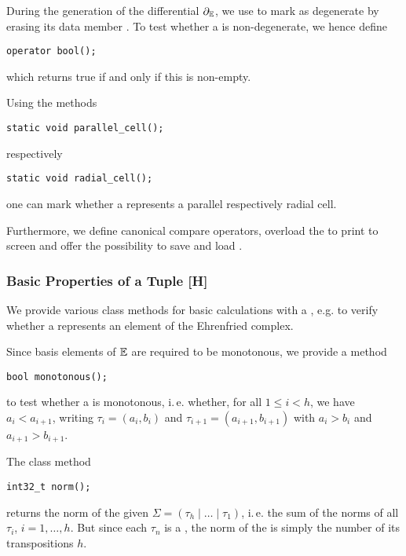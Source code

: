 During the generation of the differential $\partial_\mathbb E$, we use to mark  as degenerate by
erasing its data member .
To test whether a  is non-degenerate, we hence define  
\begin{lstlisting}
operator bool();
\end{lstlisting}
which returns true if and only if this  is non-empty.

Using the methods
\begin{lstlisting}
static void parallel_cell(); 
\end{lstlisting}
respectively
\begin{lstlisting}
static void radial_cell();
\end{lstlisting}
one can mark whether a  represents a parallel respectively radial cell.

Furthermore, we define canonical compare operators, 
overload the  to print  to screen
and offer the possibility to save and load .

\subsubsection{Basic Properties of a Tuple [H]}\label{program:kappa:tuple:basics}

We provide various class methods for basic calculations with a ,
e.g. to verify whether a  represents an element of the Ehrenfried complex. 

Since basis elements of $\mathbb E$ are required to be monotonous, we provide a method
\begin{lstlisting}
bool monotonous();
\end{lstlisting}
to test whether a  is monotonous, i.\,e. whether, for all $1 \leq i < h$, we have $a_i < a_{i+1}$, 
writing $\tau_i = (a_i, b_i)$ and $\tau_{i+1} = (a_{i+1}, b_{i+1})$ with $a_i > b_i$ and $a_{i+1} > b_{i+1}$.

The class method
\begin{lstlisting}
int32_t norm();
\end{lstlisting}
returns the norm of the given  $\Sigma = (\tau_h \mid \ldots \mid \tau_1)$, 
i.\,e. the sum of the norms of all $\tau_i$, $i = 1, \dotsc, h$. 
But since each $\tau_n$ is a , the norm of the  is simply the number of its transpositions $h$. 

